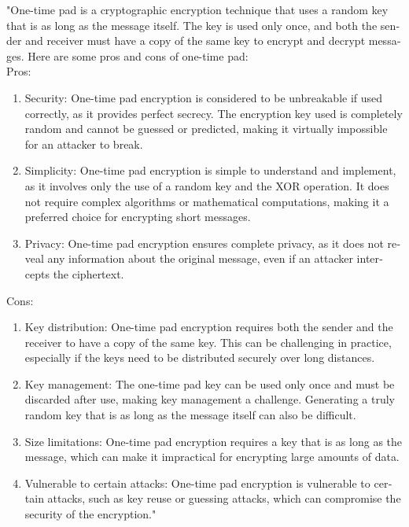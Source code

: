 \documentclass{article}
\begin{document}
\begin{latin}
"One-time pad is a cryptographic encryption technique that uses a random key that is as long as the message itself. The key is used only once, and both the sender and receiver must have a copy of the same key to encrypt and decrypt messages. Here are some pros and cons of one-time pad:\\
Pros:
\begin{enumerate}

    \item Security: One-time pad encryption is considered to be unbreakable if used correctly, as it provides perfect secrecy. The encryption key used is completely random and cannot be guessed or predicted, making it virtually impossible for an attacker to break.

    \item Simplicity: One-time pad encryption is simple to understand and implement, as it involves only the use of a random key and the XOR operation. It does not require complex algorithms or mathematical computations, making it a preferred choice for encrypting short messages.

    \item Privacy: One-time pad encryption ensures complete privacy, as it does not reveal any information about the original message, even if an attacker intercepts the ciphertext.
\end{enumerate}
Cons:
\begin{enumerate}
    \item Key distribution: One-time pad encryption requires both the sender and the receiver to have a copy of the same key. This can be challenging in practice, especially if the keys need to be distributed securely over long distances.

    \item Key management: The one-time pad key can be used only once and must be discarded after use, making key management a challenge. Generating a truly random key that is as long as the message itself can also be difficult.

    \item Size limitations: One-time pad encryption requires a key that is as long as the message, which can make it impractical for encrypting large amounts of data.

    \item Vulnerable to certain attacks: One-time pad encryption is vulnerable to certain attacks, such as key reuse or guessing attacks, which can compromise the security of the encryption."
\end{enumerate}
\end{latin}
\end{document}
